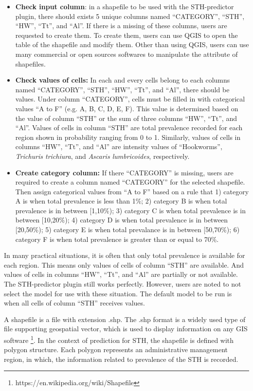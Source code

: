 \documentclass[12pt,oneside]{memoir}
\begin{document}
\begin{itemize}
 \item \textbf{Check input column}: in a shapefile to be used with the STH-predictor plugin, there should exists 5 unique columns named ``CATEGORY'', ``STH'', ``HW'', ``Tt'', and ``Al''. If there is a missing of these columns, users are requested to create them. To create them, users can use QGIS to open the table of the shapefile and modify them. Other than using QGIS, users can use many commercial or open sources softwares to manipulate the attribute of shapefiles.
 \item \textbf{Check values of cells:} In each and every cells belong to each columns named ``CATEGORY'', ``STH'', ``HW'', ``Tt'', and ``Al'', there should be values. Under column ``CATEGORY'', cells must be filled in with categorical values ``A to F'' (e.g. A, B, C, D, E, F). This value is determined based on the value of column ``STH'' or the sum of three columns ``HW'', ``Tt'', and ``Al''. Values of cells in column ``STH'' are total prevalence recorded for each region shown in probability ranging from 0 to 1. Similarly, values of cells in columns ``HW'', ``Tt'', and ``Al'' are intensity values of ``Hookworms'', \textit{Trichuris trichiura}, and \textit{Ascaris lumbricoides}, respectively. 
 \item \textbf{Create category column:} If there ``CATEGORY'' is missing, users are required to create a column named ``CATEGORY'' for the selected shapefile. Then assign categorical values from ``A to F'' based on a rule that 1) category A is when total prevalence is less than 1\%; 2) category B is when total prevalence is in between [1,10\%);  3) category C is when total prevalence is in between [10,20\%); 4) category D is when total prevalence is in between [20,50\%); 5) category E is when total prevalance is in between [50,70\%); 6) category F is when total prevalence is greater than or equal to  70\%. 
\end{itemize}

In many practical situations, it is often that only total prevalence is available for each region. This means only values of cells of column ``STH'' are available. And values of cells in columns ``HW'', ``Tt'', and ``Al'' are partially or not available. The STH-predictor plugin still works perfectly. However, users are noted to not select the model for use with these situation. The default model to be run is when all cells of column ``STH'' receives values. 


A shapefile is a file with extension .shp. The .shp format is a widely used type of file supporting geospatial vector, which is used to display information on any GIS software \footnote{https://en.wikipedia.org/wiki/Shapefile}. In the context of prediction for STH, the shapefile is defined with polygon structure. Each polygon represents an administrative management region, in which, the information related to prevalence of the STH is recorded. 
\end{document}
